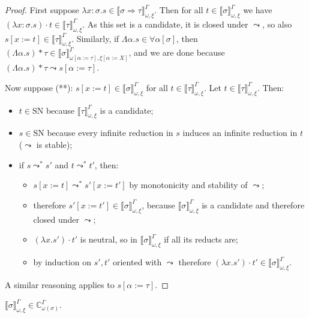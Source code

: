 \documentclass[runningheads,a4paper]{llncs}
\newcommand{\quant}[2]{\forall #1[#2]}
\newcommand{\arrtype}{\Rightarrow}
\newcommand{\abs}[2]{\lambda #1.#2}
\newcommand{\tabs}[2]{\Lambda #1.#2}
\newcommand{\app}[2]{#1 \cdot #2}
\newcommand{\tapp}[2]{#1 * #2}
\newcommand{\subst}[2]{#1:=#2}
\newcommand{\SN}{\mathrm{SN}}
\newcommand{\Cb}{\mathbb{C}}
\newcommand{\val}[3]{\ensuremath{\llbracket#1\rrbracket_{#2}^{#3}}}
\begin{document}
\begin{proof}
  First suppose $\abs{x:\sigma}{s} \in \val{\sigma \arrtype \tau}{\omega,
  \xi}{\Gamma}$.  Then for all $t \in \val{\sigma}{\omega,\xi}{\Gamma}$ we
  have $\app{(\abs{x:\sigma}{s})}{t} \in \val{\tau}{\omega,\xi}{\Gamma}$.
  As this set is a candidate, it is closed under $\leadsto$, so also
  $s[x:=t] \in \val{\tau}{\omega,\xi}{\Gamma}$.
  Similarly, if $\tabs{\alpha}{s} \in \quant{\alpha}{\sigma}$, then
  $\tapp{(\tabs{\alpha}{s})}{\tau} \in \val{\sigma}{
  \omega[\subst{\alpha}{\tau}],\xi[\subst{\alpha}{X}]}{\Gamma}$, and we are
  done because $\tapp{(\tabs{\alpha}{s})}{\tau} \leadsto s[\alpha:=\tau]$.

  Now suppose (**): $s[x:=t] \in \val{\sigma}{\omega,\xi}{\Gamma}$ for all
  $t \in \val{\tau}{\omega,\xi}{\Gamma}$.  Let $t \in \val{\tau}{\omega,
  \xi}{\Gamma}$.  Then:
  \begin{itemize}
  \item $t \in \SN$ because $\val{\tau}{\omega,\xi}{\Gamma}$ is a candidate;
  \item $s \in \SN$ because every infinite reduction in $s$ induces an
    infinite reduction in $t$ ($\leadsto$ is stable);
  \item if $s \leadsto^* s'$ and $t \leadsto^* t'$, then:
    \begin{itemize}
    \item $s[x:=t] \leadsto^* s'[x:=t']$ by monotonicity and stability of
      $\leadsto$;
    \item therefore $s'[x:=t'] \in \val{\sigma}{\omega,\xi}{\Gamma}$, because
      $\val{\sigma}{\omega,\xi}{\Gamma}$ is a candidate and therefore closed
      under $\leadsto$;
    \item $\app{(\abs{x}{s'})}{t'}$ is neutral, so in
      $\val{\sigma}{\omega,\xi}{\Gamma}$ if all its reducts are;
    \item by induction on $s',t'$ oriented with $\leadsto$ therefore
      $\app{(\abs{x}{s'})}{t'} \in \val{\sigma}{\omega,\xi}{\Gamma}$.
    \end{itemize}
  \end{itemize}
  A similar reasoning applies to $s[\alpha:=\tau]$.
\end{proof}

\begin{lemma}\label{lem_val_computable}
  $\val{\sigma}{\omega,\xi}{\Gamma} \in \Cb_{\omega(\sigma)}^\Gamma$.
\end{lemma}
\end{document}
